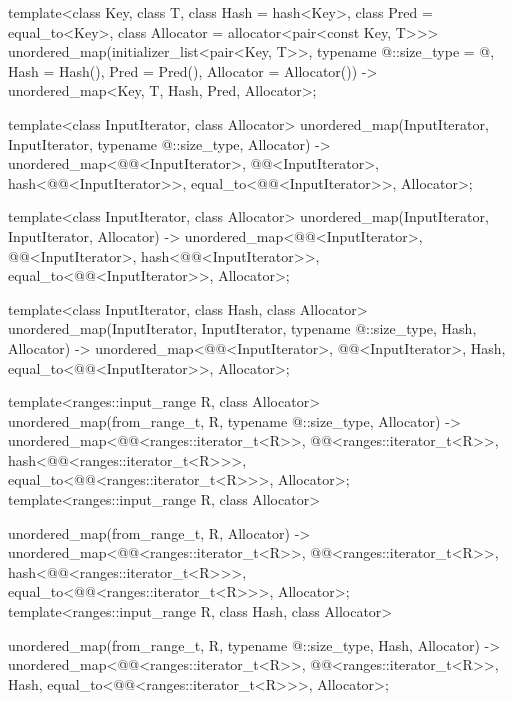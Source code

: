 \documentclass{wg21}
\begin{document}
\begin{codeblock}

template<class Key, class T, class Hash = hash<Key>,
class Pred = equal_to<Key>, class Allocator = allocator<pair<const Key, T>>>
unordered_map(initializer_list<pair<Key, T>>,
typename @\seebelow@::size_type = @\seebelow@, Hash = Hash(),
Pred = Pred(), Allocator = Allocator())
-> unordered_map<Key, T, Hash, Pred, Allocator>;

template<class InputIterator, class Allocator>
unordered_map(InputIterator, InputIterator, typename @\seebelow@::size_type, Allocator)
-> unordered_map<@@<InputIterator>, @@<InputIterator>,
hash<@@<InputIterator>>,
equal_to<@@<InputIterator>>, Allocator>;

template<class InputIterator, class Allocator>
unordered_map(InputIterator, InputIterator, Allocator)
-> unordered_map<@@<InputIterator>, @@<InputIterator>,
hash<@@<InputIterator>>,
equal_to<@@<InputIterator>>, Allocator>;

template<class InputIterator, class Hash, class Allocator>
unordered_map(InputIterator, InputIterator, typename @\seebelow@::size_type, Hash, Allocator)
-> unordered_map<@@<InputIterator>, @@<InputIterator>, Hash,
equal_to<@@<InputIterator>>, Allocator>;


\end{codeblock}
\begin{addedblock}
\begin{codeblock}
template<ranges::input_range R, class Allocator>
unordered_map(from_range_t, R, typename @\seebelow@::size_type, Allocator)
-> unordered_map<@@<ranges::iterator_t<R>>,
        @@<ranges::iterator_t<R>>,
        hash<@@<ranges::iterator_t<R>>>,
        equal_to<@@<ranges::iterator_t<R>>>, Allocator>;
template<ranges::input_range R, class Allocator>

unordered_map(from_range_t, R, Allocator)
-> unordered_map<@@<ranges::iterator_t<R>>,
    @@<ranges::iterator_t<R>>,
    hash<@@<ranges::iterator_t<R>>>,
    equal_to<@@<ranges::iterator_t<R>>>, Allocator>;
template<ranges::input_range R, class Hash, class Allocator>

unordered_map(from_range_t, R, typename @\seebelow@::size_type, Hash, Allocator)
-> unordered_map<@@<ranges::iterator_t<R>>,
    @@<ranges::iterator_t<R>>,
    Hash,
    equal_to<@@<ranges::iterator_t<R>>>, Allocator>;
\end{codeblock}
\end{addedblock}
\end{document}
